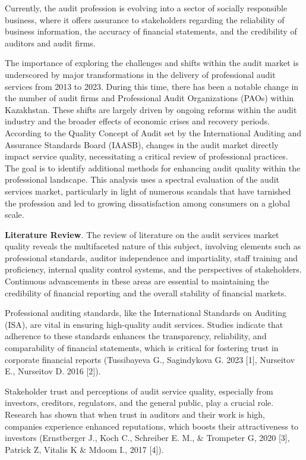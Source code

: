Currently, the audit profession is evolving into a sector of socially
responsible business, where it offers assurance to stakeholders
regarding the reliability of business information, the accuracy of
financial statements, and the credibility of auditors and audit firms.

The importance of exploring the challenges and shifts within the audit
market is underscored by major transformations in the delivery of
professional audit services from 2013 to 2023. During this time, there
has been a notable change in the number of audit firms and Professional
Audit Organizations (PAOs) within Kazakhstan. These shifts are largely
driven by ongoing reforms within the audit industry and the broader
effects of economic crises and recovery periods. According to the
Quality Concept of Audit set by the International Auditing and Assurance
Standards Board (IAASB), changes in the audit market directly impact
service quality, necessitating a critical review of professional
practices. The goal is to identify additional methods for enhancing
audit quality within the professional landscape. This analysis uses a
spectral evaluation of the audit services market, particularly in light
of numerous scandals that have tarnished the profession and led to
growing dissatisfaction among consumers on a global scale.

\hl{}

\textbf{Literature Review}\emph{.} The review of literature on the audit
services market quality reveals the multifaceted nature of this subject,
involving elements such as professional standards, auditor independence
and impartiality, staff training and proficiency, internal quality
control systems, and the perspectives of stakeholders. Continuous
advancements in these areas are essential to maintaining the credibility
of financial reporting and the overall stability of financial markets.

Professional auditing standards, like the International Standards on
Auditing (ISA), are vital in ensuring high-quality audit services.
Studies indicate that adherence to these standards enhances the
transparency, reliability, and comparability of financial statements,
which is critical for fostering trust in corporate financial reports
(Tussibayeva G., Sagindykova G. 2023 {[}1{]}, Nurseitov E., Nurseitov D.
2016 {[}2{]}).

Stakeholder trust and perceptions of audit service quality, especially
from investors, creditors, regulators, and the general public, play a
crucial role. Research has shown that when trust in auditors and their
work is high, companies experience enhanced reputations, which boosts
their attractiveness to investors (Ernstberger J., Koch C., Schreiber E.
M., \& Trompeter G, 2020 {[}3{]}, Patrick Z, Vitalis K \& Mdoom I., 2017
{[}4{]}).

